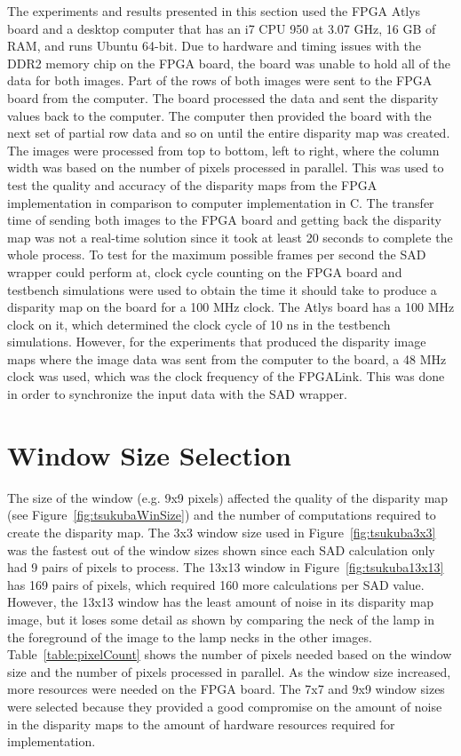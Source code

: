 The experiments and results presented in this section used the FPGA Atlys board and a desktop computer that has an i7 CPU 950 at 3.07 GHz, 16 GB of RAM, and runs Ubuntu 64-bit. Due to hardware and timing issues with the DDR2 memory chip on the FPGA board, the board was unable to hold all of the data for both images. Part of the rows of both images were sent to the FPGA board from the computer. The board processed the data and sent the disparity values back to the computer. The computer then provided the board with the next set of partial row data and so on until the entire disparity map was created. The images were processed from top to bottom, left to right, where the column width was based on the number of pixels processed in parallel. This was used to test the quality and accuracy of the disparity maps from the FPGA implementation in comparison to computer implementation in C. The transfer time of sending both images to the FPGA board and getting back the disparity map was not a real-time solution since it took at least 20 seconds to complete the whole process. To test for the maximum possible frames per second the SAD wrapper could perform at, clock cycle counting on the FPGA board and testbench simulations were used to obtain the time it should take to produce a disparity map on the board for a 100 MHz clock. The Atlys board has a 100 MHz clock on it, which determined the clock cycle of 10 ns in the testbench simulations. However, for the experiments that produced the disparity image maps where the image data was sent from the computer to the board, a 48 MHz clock was used, which was the clock frequency of the FPGALink. This was done in order to synchronize the input data with the SAD wrapper. 

\section{Window Size Selection}
\label{sec:windowSize}

The size of the window (e.g. 9x9 pixels) affected the quality of the disparity map (see Figure~\ref{fig:tsukubaWinSize}) and the number of computations required to create the disparity map. The 3x3 window size used in Figure~\ref{fig:tsukuba3x3} was the fastest out of the window sizes shown since each SAD calculation only had 9 pairs of pixels to process. The 13x13 window in Figure~\ref{fig:tsukuba13x13} has 169 pairs of pixels, which required 160 more calculations per SAD value. However, the 13x13 window has the least amount of noise in its disparity map image, but it loses some detail as shown by comparing the neck of the lamp in the foreground of the image to the lamp necks in the other images. Table~\ref{table:pixelCount} shows the number of pixels needed based on the window size and the number of pixels processed in parallel. As the window size increased, more resources were needed on the FPGA board. The 7x7 and 9x9 window sizes were selected because they provided a good compromise on the amount of noise in the disparity maps to the amount of hardware resources required for implementation.

